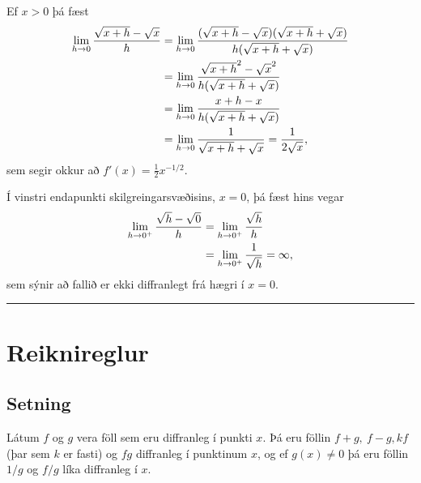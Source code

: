 \documentclass[b5paper,10pt,icelandic]{sphinxmanual}
\begin{document}
Ef \(x>0\) þá fæst
\begin{gather}
\begin{split}\begin{aligned}
  \lim_{h\to 0} \frac{\sqrt{x+h}-\sqrt{x}}h &=
  \lim_{h\to 0} \frac{(\sqrt{x+h}-\sqrt{x})(\sqrt{x+h}+\sqrt{x})}{h(\sqrt{x+h}+\sqrt{x})}\\
  &= \lim_{h\to 0} \frac{\sqrt{x+h}^2-\sqrt{x}^2}{h(\sqrt{x+h}+\sqrt{x})}\\
  &= \lim_{h\to 0} \frac{x+h-x}{h(\sqrt{x+h}+\sqrt{x})}\\
  &= \lim_{h\to 0} \frac{1}{\sqrt{x+h}+\sqrt{x}} = \frac{1}{2\sqrt{x}},\end{aligned}\end{split}\notag
\end{gather}
sem segir okkur að \(f'(x) = \frac 12 x^{-1/2}\).

Í vinstri endapunkti skilgreingarsvæðisins, \(x=0\), þá fæst hins
vegar
\begin{gather}
\begin{split}\begin{aligned}
  \lim_{h\to 0^+} \frac{\sqrt{h}-\sqrt{0}}h &=
  \lim_{h\to 0^+} \frac{\sqrt{h}}h\\
  &= \lim_{h\to 0^+} \frac{1}{\sqrt{h}} = \infty,\end{aligned}\end{split}\notag
\end{gather}
sem sýnir að fallið er ekki diffranlegt frá hægri í \(x=0\).


\bigskip\hrule{}\bigskip



\section{Reiknireglur}
\label{kafli03:reiknireglur}

\subsection{Setning}
\label{kafli03:id4}\label{kafli03:setning-3-3-1}
Látum \(f\) og \(g\) vera föll sem eru diffranleg í punkti
\(x\). Þá eru föllin \(f+g,\ f-g, kf\) (þar sem \(k\) er
fasti) og \(fg\) diffranleg í punktinum \(x\), og ef
\(g(x)\neq 0\) þá eru föllin \(1/g\) og \(f/g\) líka
diffranleg í \(x\).
\end{document}
